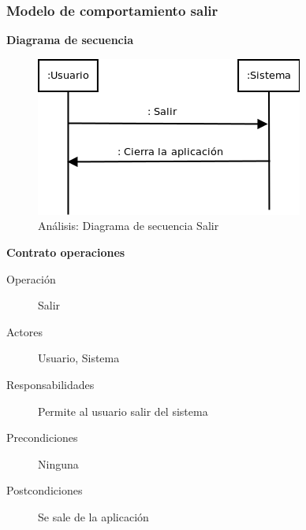 \subsubsection{Modelo de comportamiento salir}

\textbf{Diagrama de secuencia}
\begin{figure}[H]
  \label{di_salir}
  \begin{center}
    \includegraphics[scale=0.5]{imagenes/dia_salir.png}
  \end{center}
  \caption{Análisis: Diagrama de secuencia Salir}
\end{figure}

\textbf{Contrato operaciones}

\begin{description}
    \item[Operación] Salir
    \item[Actores] Usuario, Sistema
    \item[Responsabilidades] Permite al usuario salir del sistema
    \item[Precondiciones] Ninguna
    \item[Postcondiciones] Se sale de la aplicación
\end{description}

